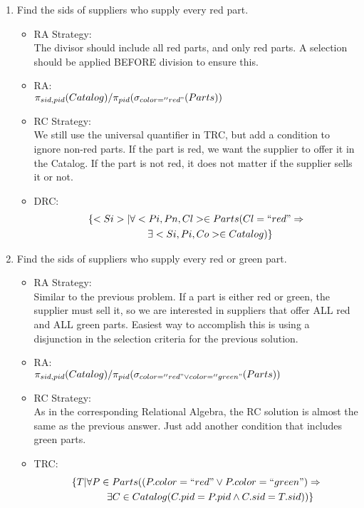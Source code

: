 \documentclass[12pt]{article}
\begin{document}
\begin{enumerate}
	\item Find the sids of suppliers who supply every red part. 

\begin{itemize}
\item RA Strategy: \\
The divisor should include all red parts, and only red parts. A selection should be applied BEFORE division to ensure this.
\item RA: \\
$\pi_{sid,pid}(Catalog)/\pi_{pid}(\sigma_{color=''red"}(Parts))$
\item RC Strategy: \\
We still use the universal quantifier in TRC, but add a condition to ignore non-red parts. If the part is red, we want the supplier to offer it in the Catalog. If the part is not red, it does not matter if the supplier sells it or not.
\item DRC:
\begin{multline*}
\{<Si>|\forall <Pi,Pn,Cl> \in Parts(Cl  = ``red" \Rightarrow  \\
	\hspace{1cm}\exists <Si,Pi,Co> \in Catalog)\} \\
\end{multline*}
\end{itemize}		
	
	\item Find the sids of suppliers who supply every red or green part. 
	
\begin{itemize}
\item RA Strategy: \\
Similar to the previous problem. If a part is either red or green, the supplier must sell it, so we are interested in suppliers that offer ALL red and ALL green parts. Easiest way to accomplish this is using a disjunction in the selection criteria for the previous solution.
\item RA: \\
$\pi_{sid,pid}(Catalog)/\pi_{pid}(\sigma_{color=''red" \vee color=''green"}(Parts))$
\item RC Strategy: \\
As in the corresponding Relational Algebra, the RC solution is almost the same as the previous answer. Just add another condition that includes green parts.
\item TRC:
\begin{multline*}
\{T|\forall P \in Parts( (P.color  = ``red" \vee P.color  = ``green") \Rightarrow \\
	\hspace{1cm}\exists C \in Catalog(C.pid = P.pid \wedge C.sid = T.sid))\} \\
\end{multline*}
\end{itemize}		
	

\end{enumerate}
\end{document}
